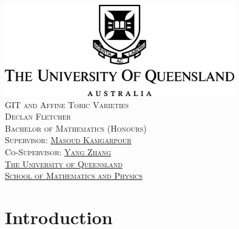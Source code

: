 \documentclass[12pt]{amsart}
\theoremstyle{plain}
\begin{document}

\begin{center}
\includegraphics[width=10cm]{../images/UQLogo.jpg} \\ 
\vspace{3cm}
{\LARGE\textsc{GIT and Affine Toric Varieties}} \\
\vspace{0.5cm}
{\textsc{Declan Fletcher}} \\
\vspace{8cm}
{\textsc{ Bachelor of Mathematics (Honours)}} \\
\vspace{1cm}
{\textsc{Supervisor: \href{https://sites.google.com/site/masoudkomi/home}{Masoud Kamgarpour}}} \\
{\textsc{Co-Supervisor: \href{https://sites.google.com/site/yangzhang139/home}{Yang Zhang}}} \\
\vspace{1cm}
{\textsc{\href{https://www.uq.edu.au/}{The University of Queensland}}} \\
{\textsc{\href{https://smp.uq.edu.au/}{School of Mathematics and Physics}}}
\end{center}


\newpage
\tableofcontents


\newpage
{}
\section{Introduction}
\end{document}

